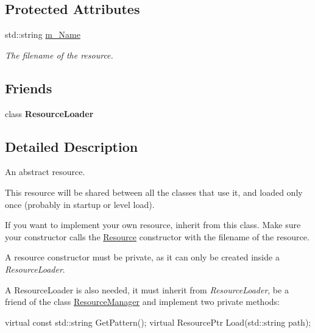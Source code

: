 \subsection*{Protected Attributes}
\begin{DoxyCompactItemize}
\item 
\mbox{\label{classTarbora_1_1Resource_ac66c4d8338373309735cfab7e8f13d97}} 
std\+::string \hyperlink{classTarbora_1_1Resource_ac66c4d8338373309735cfab7e8f13d97}{m\+\_\+\+Name}
\begin{DoxyCompactList}\small\item\em The filename of the resource. \end{DoxyCompactList}\end{DoxyCompactItemize}
\subsection*{Friends}
\begin{DoxyCompactItemize}
\item 
\mbox{\label{classTarbora_1_1Resource_a685a33b83a13f36aceea3ff940994ac9}} 
class {\bfseries Resource\+Loader}
\end{DoxyCompactItemize}


\subsection{Detailed Description}
An abstract resource. 

This resource will be shared between all the classes that use it, and loaded only once (probably in startup or level load).

If you want to implement your own resource, inherit from this class. Make sure your constructor calls the \hyperlink{classTarbora_1_1Resource}{Resource} constructor with the filename of the resource.

A resource constructor must be private, as it can only be created inside a {\itshape Resource\+Loader}.

A Resource\+Loader is also needed, it must inherit from {\itshape Resource\+Loader}, be a friend of the class \hyperlink{classTarbora_1_1ResourceManager}{Resource\+Manager} and implement two private methods\+:


\begin{DoxyCode}
\textcolor{keyword}{virtual} \textcolor{keyword}{const} std::string GetPattern();
\textcolor{keyword}{virtual} ResourcePtr Load(std::string path);
\end{DoxyCode}


